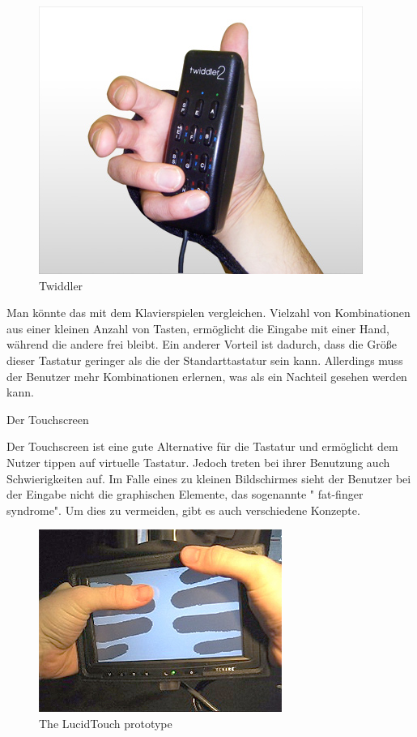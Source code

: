  \begin{figure}[h]
 \centering
 \includegraphics[height=0.25\textheight]{img/twiddler.jpg}
 \caption{Twiddler}
\end{figure}

Man könnte das mit dem Klavierspielen vergleichen. Vielzahl von Kombinationen aus einer kleinen Anzahl von Tasten, ermöglicht die Eingabe mit einer Hand, während die andere frei bleibt. Ein anderer Vorteil ist dadurch, dass die Größe dieser Tastatur geringer als die der Standarttastatur sein kann. Allerdings muss der Benutzer mehr Kombinationen erlernen, was als ein Nachteil gesehen werden kann.


Der Touchscreen

Der Touchscreen ist eine gute Alternative für die Tastatur und ermöglicht dem Nutzer tippen auf virtuelle Tastatur. Jedoch treten bei ihrer Benutzung auch Schwierigkeiten auf. Im Falle eines zu kleinen Bildschirmes sieht der Benutzer bei der Eingabe nicht die graphischen Elemente, das sogenannte " fat-finger syndrome".  Um dies zu vermeiden, gibt es auch verschiedene Konzepte.

 \begin{figure}[h]
 \centering
 \includegraphics[height=0.25\textheight]{img/lucidtouch.jpg}
 \caption{The LucidTouch prototype}
\end{figure}

